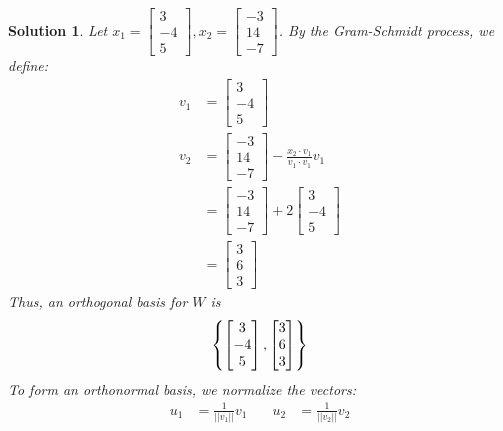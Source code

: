 \documentclass[11pt]{scrartcl}
\theoremstyle{dotlessP}
\newtheorem{sol}{Solution}[section]
\theoremstyle{dotlessN}
\DeclarePairedDelimiter\set{\{}{\}}
\begin{document}
\begin{sol}
	Let $x_1 = 
\begin{bmatrix}
	3 \\
	-4 \\
	5
\end{bmatrix},
x_2 =
\begin{bmatrix}
	-3 \\
	14 \\
	-7
\end{bmatrix}
	$. By the Gram-Schmidt process, we define:
	\begin{align*}
		v_1 &= 
		\begin{bmatrix}
			3 \\
			-4 \\
			5
		\end{bmatrix} \\
		v_2 &= 
		\begin{bmatrix}
			-3 \\
			14 \\
			-7
		\end{bmatrix} -
		\frac{x_2 \cdot v_1}{v_1 \cdot v_1} v_1 \\
			&= 
		\begin{bmatrix}
			-3 \\
			14 \\
			-7
		\end{bmatrix} +2
		\begin{bmatrix}
			3 \\
			-4 \\
			5
		\end{bmatrix} \\
			&= 
			\begin{bmatrix}
				3 \\
				6 \\
				3
			\end{bmatrix}
	\end{align*}
	Thus, an orthogonal basis for $W$ is
	\[
		\set*{
\begin{bmatrix}
	3 \\
	-4 \\
	5
\end{bmatrix},
\begin{bmatrix}
	3 \\
	6 \\
	3
\end{bmatrix}
		}
	\] 
	To form an orthonormal basis, we normalize the vectors:
	\begin{align*}
		u_1 &= 
		\frac{1}{||v_1||}v_1 &\quad u_2 &= \frac{1}{||v_2||}v_2 \\

\end{align*}
\end{sol}
\end{document}
